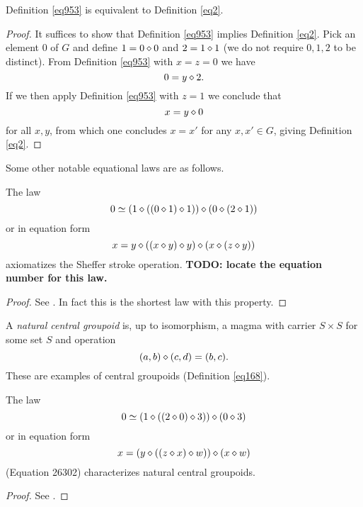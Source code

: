 \begin{theorem}[953 is equivalent to 2]\label{953_equiv_2}\leanok  Definition \ref{eq953} is equivalent to Definition \ref{eq2}.
\end{theorem}

\begin{proof}\leanok  It suffices to show that Definition \ref{eq953} implies Definition \ref{eq2}.  Pick an element $0$ of $G$ and define $1 = 0 \diamond 0$ and $2 = 1 \diamond 1$ (we do not require $0,1,2$ to be distinct).
From Definition \ref{eq953} with $x=z=0$ we have
$$ 0 = y \diamond 2.$$
If we then apply Definition \ref{eq953} with $z=1$ we conclude that
$$ x = y \diamond 0$$
for all $x,y$, from which one concludes $x=x'$ for any $x,x' \in G$, giving Definition \ref{eq2}.
\end{proof}


Some other notable equational laws are as follows.

\begin{theorem}\label{sheffer}  The law
$$ 0 \simeq (1 \diamond ((0 \diamond 1) \diamond 1)) \diamond (0 \diamond (2 \diamond 1))$$
or in equation form
$$ x = y \diamond ((x \diamond y) \diamond y) \diamond (x \diamond (z \diamond y)) $$
axiomatizes the Sheffer stroke operation. {\bf TODO: locate the equation number for this law.}
\end{theorem}

\begin{proof}
See \cite{mccune_et_al}.  In fact this is the shortest law with this property.
\end{proof}

A \emph{natural central groupoid} is, up to isomorphism, a magma with carrier $S \times S$ for some set $S$ and operation
$$ (a,b) \diamond (c,d) = (b,c).$$
These are examples of central groupoids (Definition \ref{eq168}).

\begin{theorem}\label{natural-central-groupoid}  The law
$$ 0 \simeq (1 \diamond ((2 \diamond 0) \diamond 3)) \diamond (0 \diamond 3)$$
or in equation form
$$ x = (y \diamond ((z \diamond x) \diamond w)) \diamond (x \diamond w)$$
(Equation 26302) characterizes natural central groupoids.
\end{theorem}

\begin{proof}
  See \cite[Theorem 5]{knuth}.
\end{proof}
